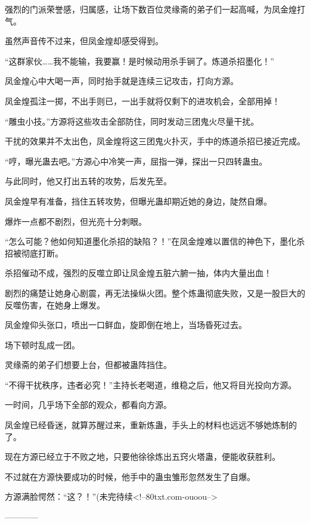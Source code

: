 \begin{this_body}
强烈的门派荣誉感，归属感，让场下数百位灵缘斋的弟子们一起高喊，为凤金煌打气。

虽然声音传不过来，但凤金煌却感受得到。

“这群家伙……我不能输，我要赢！是时候动用杀手锏了。炼道杀招墨化！”

凤金煌心中大喝一声，同时抬手就是连续三记攻击，打向方源。

凤金煌孤注一掷，不出手则已，一出手就将仅剩下的进攻机会，全部用掉！

“雕虫小技。”方源将这些攻击全部防住，同时发动三团鬼火尽量干扰。

干扰的效果并不太出色，凤金煌将这三团鬼火扑灭，手中的炼道杀招已接近完成。

“哼，曝光蛊去吧。”方源心中冷笑一声，屈指一弹，探出一只四转蛊虫。

与此同时，他又打出五转的攻势，后发先至。

凤金煌早有准备，挡住五转攻势，但曝光蛊却期近她的身边，陡然自爆。

爆炸一点都不剧烈，但光亮十分刺眼。

“怎么可能？他如何知道墨化杀招的缺陷？！”在凤金煌难以置信的神色下，墨化杀招被彻底打断。

杀招催动不成，强烈的反噬立即让凤金煌五脏六腑一抽，体内大量出血！

剧烈的痛楚让她身心剧震，再无法操纵火团。整个炼蛊彻底失败，又是一股巨大的反噬伤害，在她身上爆发。

凤金煌仰头张口，喷出一口鲜血，旋即倒在地上，当场昏死过去。

场下顿时乱成一团。

灵缘斋的弟子们想要上台，但都被蛊阵挡住。

“不得干扰秩序，违者必究！”主持长老喝道，维稳之后，他又将目光投向方源。

一时间，几乎场下全部的观众，都看向方源。

凤金煌已经昏迷，就算苏醒过来，重新炼蛊，手头上的材料也远远不够她炼制的了。

现在方源已经立于不败之地，只要他徐徐炼出五窍火塔蛊，便能收获胜利。

不过就在方源快要成功的时候，他手中的蛊虫雏形忽然发生了自爆。

方源满脸愕然：“这？！”(未完待续<!--80txt.com-ouoou-->

------------

\end{this_body}

